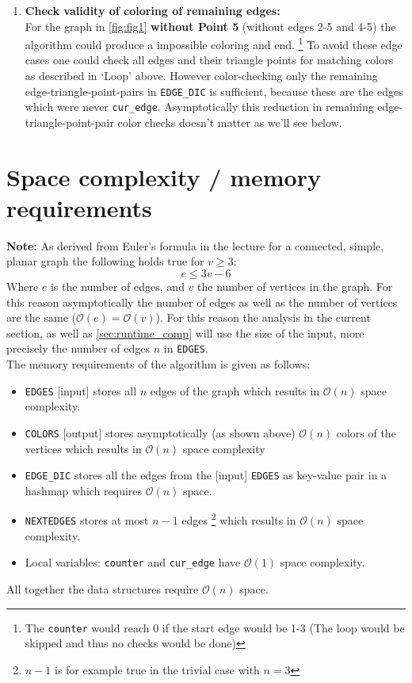 \documentclass[english]{scrartcl}
\newcommand{\code}{\texttt}
\begin{document}
\begin{enumerate}
    \item \textbf{Check validity of coloring of remaining edges:}\\For the graph in \autoref{fig:fig1} \textbf{without Point 5} (without edges 2-5 and 4-5) the algorithm could produce a impossible coloring and end. \footnote{The \code{counter} would reach 0 if the start edge would be 1-3 (The loop would be skipped and thus no checks would be done)} To avoid these edge cases one could check all edges and their triangle points for matching colors as described in \enquote*{Loop} above. However color-checking only the remaining edge-triangle-point-pairs in \code{EDGE\_DIC} is sufficient, because these are the edges which were never \code{cur\_edge}. Asymptotically this reduction in remaining edge-triangle-point-pair color checks doesn't matter as we'll see below. 
\end{enumerate}


\section{Space complexity / memory requirements}
\label{sec:space_compl}
\textbf{Note:} As derived from Euler's formula in the lecture for a connected, simple, planar graph the following holds true for $v \geq 3$:
\begin{equation}
    \label{eq:euler}
    e \leq 3 v-6 
\end{equation}
Where $e$ is the number of edges, and $v$ the number of vertices in the graph. For this reason asymptotically the number of edges as well as the number of vertices are the same ($\mathcal{O}(e) = \mathcal{O}(v)$). 
For this reason the analysis in the current section, as well as \autoref{sec:runtime_comp} will use the size of the input, more precisely the number of edges $n$ in \code{EDGES}.\\
\newline
The memory requirements of the algorithm is given as follows:
\begin{itemize}
    \item \code{EDGES} [input] stores all $n$ edges of the graph which results in $\mathcal{O}(n)$ space complexity.
    \item \code{COLORS} [output] stores asymptotically (as shown above) $\mathcal{O}(n)$ colors of the vertices which results in $\mathcal{O}(n)$ space complexity
    \item \code{EDGE\_DIC} stores all the edges from the [input] \code{EDGES} as key-value pair in a hashmap which requires $\mathcal{O}(n)$ space. 
    \item \code{NEXTEDGES} stores at most $n-1$ edges \footnote{$n-1$ is for example true in the trivial case with $n=3$} which results in $\mathcal{O}(n)$ space complexity.
    \item Local variables: \code{counter} and \code{cur\_edge} have $\mathcal{O}(1)$ space complexity.
\end{itemize}
All together the data structures require $\mathcal{O}(n)$ space. 
\end{document}
